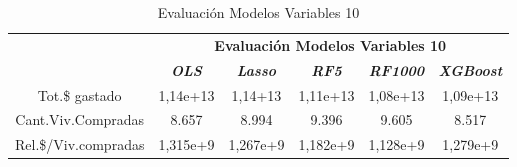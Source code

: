 \documentclass[conference, 10pt]{IEEEtran}
\begin{document}
\begin{table}[htbp]
\caption{Evaluación Modelos Variables 10}
\begin{center}
\begin{tabular}{|c|c|c|c|c|c|}
\hline
&\multicolumn{5}{|c|}{\textbf{Evaluación Modelos Variables 10}} \\
\cline{2-6} 
& \textbf{\textit{OLS}}& \textbf{\textit{Lasso}}& \textbf{\textit{RF5}}& \textbf{\textit{RF1000}}& \textbf{\textit{XGBoost}} \\
\hline
Tot.\$ gastado& 1,14e+13& 1,14+13& 1,11e+13& 1,08e+13& 1,09e+13 \\
\hline
Cant.Viv.Compradas& 8.657& 8.994& 9.396& 9.605& 8.517 \\
\hline
Rel.\$/Viv.compradas& 1,315e+9& 1,267e+9& 1,182e+9& 1,128e+9& 1,279e+9 \\

\hline
\end{tabular}
\label{tab_11}
\end{center}
\end{table}
\end{document}
